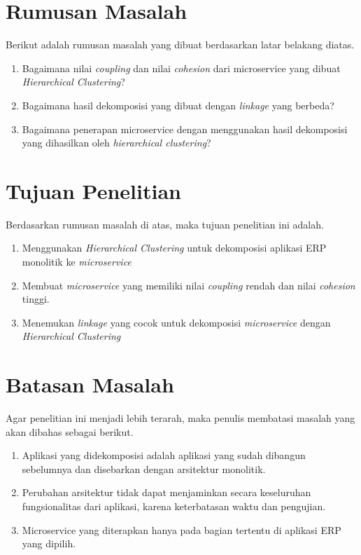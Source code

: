 \hfill \break

\section{Rumusan Masalah}
Berikut adalah rumusan masalah yang dibuat berdasarkan latar belakang diatas.
\begin{enumerate}[nolistsep,leftmargin=0.5cm]
  \item Bagaimana nilai \textit{coupling} dan nilai \textit{cohesion} dari microservice yang dibuat \textit{Hierarchical Clustering}?
  \item Bagaimana hasil dekomposisi yang dibuat dengan \textit{linkage} yang berbeda?
  \item Bagaimana penerapan microservice dengan menggunakan hasil dekomposisi yang dihasilkan oleh \textit{hierarchical clustering}?\\
\end{enumerate}

\section{Tujuan Penelitian}
Berdasarkan rumusan masalah di atas, maka tujuan penelitian ini adalah.
\begin{enumerate}[nolistsep,leftmargin=0.5cm]
  \item Menggunakan \textit{Hierarchical Clustering} untuk dekomposisi aplikasi ERP monolitik ke \textit{microservice}
  \item Membuat \textit{microservice} yang memiliki nilai \textit{coupling} rendah dan nilai \textit{cohesion} tinggi.
  \item Menemukan \textit{linkage} yang  cocok untuk dekomposisi \textit{microservice} dengan \textit{Hierarchical Clustering} \\
\end{enumerate}

\section{Batasan Masalah}
Agar penelitian ini menjadi lebih terarah, maka penulis membatasi masalah yang akan dibahas sebagai berikut.
\begin{enumerate}[nolistsep,leftmargin=0.5cm]
  \item Aplikasi yang didekomposisi adalah aplikasi yang sudah dibangun sebelumnya dan disebarkan dengan arsitektur monolitik.
  \item Perubahan arsitektur tidak dapat menjaminkan secara keseluruhan fungsionalitas dari aplikasi, karena keterbatasan waktu dan pengujian.
  \item Microservice yang diterapkan hanya pada bagian tertentu di aplikasi ERP yang dipilih.\\
\end{enumerate}

